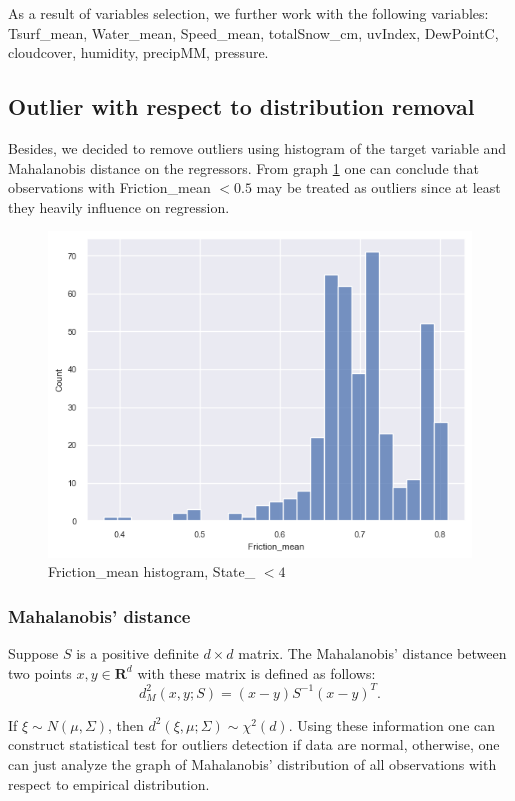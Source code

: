 \documentclass[12pt, bachelor, substylefile = algo_title.rtx]{disser}
\theoremstyle{definition}
\begin{document}
As a result of variables selection, we further work with the following variables: Tsurf\_mean,
       Water\_mean, Speed\_mean, totalSnow\_cm,
       uvIndex, DewPointC, cloudcover, humidity, precipMM,
      pressure.

\subsection{Outlier with respect to distribution removal}
Besides, we decided to remove outliers using histogram of the target variable and Mahalanobis distance on the regressors. From graph \ref{fig: 10} one can conclude that observations with Friction\_mean $< 0.5$ may be treated as outliers since at least they heavily influence on regression. 
\begin{figure}[!h]
\centering
   \begin{minipage}{0.7\textwidth}
     \includegraphics[width=\linewidth]{friction_dist}
   \end{minipage}
\caption{Friction\_mean histogram, State\_ $<4$}
\label{fig: 10}
\end{figure}

\subsubsection{Mahalanobis' distance}
Suppose $S$ is a positive definite $d\times d$ matrix. The Mahalanobis' distance between two points $x, y \in \mathbf{R}^d$ with these matrix is defined as follows:
\[ d^2_M(x,y; S) = (x-y)S^{-1}(x-y)^{T}. \]

If $\xi \sim N(\mu, \Sigma)$, then $d^2(\xi, \mu; \Sigma) \sim \chi^2(d)$. Using these information one can construct statistical test for outliers detection if data are normal, otherwise, one can just analyze the graph of Mahalanobis' distribution of all observations with respect to empirical distribution.
\end{document}
